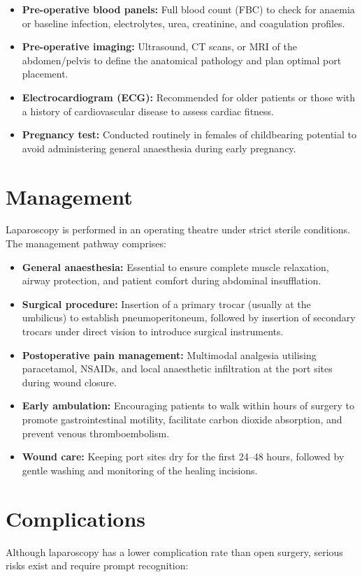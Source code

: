 \begin{itemize}
    \item \textbf{Pre-operative blood panels:} Full blood count (FBC) to check for anaemia or baseline infection, electrolytes, urea, creatinine, and coagulation profiles.
    \item \textbf{Pre-operative imaging:} Ultrasound, CT scans, or MRI of the abdomen/pelvis to define the anatomical pathology and plan optimal port placement.
    \item \textbf{Electrocardiogram (ECG):} Recommended for older patients or those with a history of cardiovascular disease to assess cardiac fitness.
    \item \textbf{Pregnancy test:} Conducted routinely in females of childbearing potential to avoid administering general anaesthesia during early pregnancy.
\end{itemize}

\section*{Management}
Laparoscopy is performed in an operating theatre under strict sterile conditions. The management pathway comprises:

\begin{itemize}
    \item \textbf{General anaesthesia:} Essential to ensure complete muscle relaxation, airway protection, and patient comfort during abdominal insufflation.
    \item \textbf{Surgical procedure:} Insertion of a primary trocar (usually at the umbilicus) to establish pneumoperitoneum, followed by insertion of secondary trocars under direct vision to introduce surgical instruments.
    \item \textbf{Postoperative pain management:} Multimodal analgesia utilising paracetamol, NSAIDs, and local anaesthetic infiltration at the port sites during wound closure.
    \item \textbf{Early ambulation:} Encouraging patients to walk within hours of surgery to promote gastrointestinal motility, facilitate carbon dioxide absorption, and prevent venous thromboembolism.
    \item \textbf{Wound care:} Keeping port sites dry for the first 24--48 hours, followed by gentle washing and monitoring of the healing incisions.
\end{itemize}

\section*{Complications}
Although laparoscopy has a lower complication rate than open surgery, serious risks exist and require prompt recognition:

